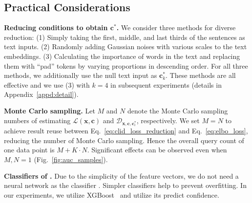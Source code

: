 \subsection{Practical Considerations}\label{sec:prac}

\textbf{Reducing conditions to obtain $\mathbf{c}^*$.} 
We consider three methods for diverse reduction:
(1) Simply taking the first, middle, and last thirds of the sentences as text inputs. (2) Randomly adding Gaussian noises with various scales to the text embeddings. (3) Calculating the importance of words in the text  \cite{tang2023daam, wang2024promptcharm} and replacing them with “pad” tokens by varying proportions in descending order. For all three methods, we additionally use the null text input as $\mathbf{c}^*_k$. These methods are all effective and we use (3) with $k=4$ in subsequent experiments (details in Appendix~\ref{appd:detail}).

\textbf{Monte Carlo sampling.}  \label{sec:mtcl_sample}
 Let $M$ and $N$ denote the Monte Carlo sampling numbers of estimating $\mathcal{L}(\mathbf{x},\mathbf{c})$ and $\mathcal{D}_{\mathbf{x},\mathbf{c},\mathbf{c}^*_i}$, respectively.
 We set $M=N$ to achieve result reuse between Eq.~\eqref{eq:clid_loss_reduction} and Eq.~\eqref{eq:elbo_loss}, reducing the number of Monte Carlo sampling.
 Hence the overall query count of one data point is $M + K \cdot N$. Significant effects can be observed even when $M, N = 1$ (Fig.~\ref{fig:auc_samples}).

\textbf{Classifiers of \clidvec.} 
 Due to the simplicity of the feature vectors, we do not need a neural network as the classifier \cite{duan2023diffusion}. Simpler classifiers help to prevent overfitting.
In our experiments, we utilize XGBoost~\cite{chen2016xgboost} and utilize its predict confidence.
